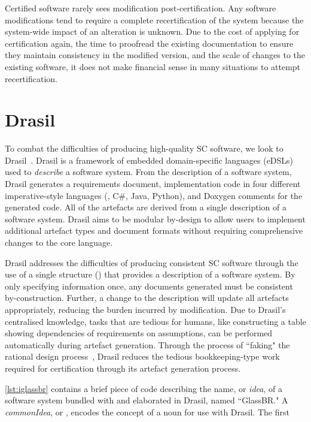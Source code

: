 Certified software rarely sees modification post-certification. Any software modifications tend to require a complete recertification of the system because the system-wide impact of an alteration is unknown. Due to the cost of applying for certification again, the time to proofread the existing documentation to ensure they maintain consistency in the modified version, and the scale of changes to the existing software, it does not make financial sense in many situations to attempt recertification. 

\section{Drasil}\label{idrasil}
To combat the difficulties of producing high-quality SC software, we look to Drasil~\cite{GitRepo}\cite{SzymczakEtAl2016}. Drasil is a framework of embedded domain-specific languages (eDSLs) used to \textit{describe} a software system. From the description of a software system, Drasil generates a requirements document, implementation code in four different imperative-style languages (\CC, C\#, Java, Python), and Doxygen comments for the generated code. All of the artefacts are derived from a single description of a software system. Drasil aims to be modular by-design to allow users to implement additional artefact types and document formats without requiring comprehensive changes to the core language.

Drasil addresses the difficulties of producing consistent SC software through the use of a single structure () that provides a description of a software system. By only specifying information once, any documents generated must be consistent by-construction. Further, a change to the description will update all artefacts appropriately, reducing the burden incurred by modification. Due to Drasil's centralised knowledge, tasks that are tedious for humans, like constructing a table showing dependencies of requirements on assumptions, can be performed automatically during artefact generation. Through the process of ``faking" the rational design process~\cite{parnas1986rational}, Drasil reduces the tedious bookkeeping-type work required for certification through its artefact generation process.

\autoref{lst:iglassbr} contains a brief piece of code describing the name, or \textit{idea}, of a software system bundled with and elaborated in Drasil, named ``GlassBR." A \textit{commonIdea}, or , encodes the concept of a noun for use with Drasil. The first \\

